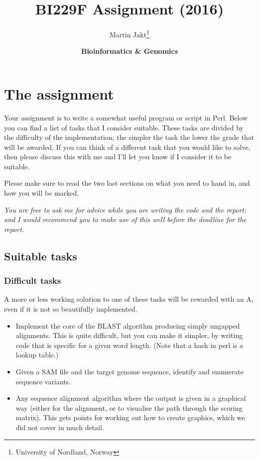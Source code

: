 \documentclass[11pt]{article}
\author{Martin Jakt\thanks{University of Nordland, Norway}}
\date{\textbf{Bioinformatics \& Genomics}}
\title{\textbf{BI229F Assignment} (2016)}
\begin{document}
\maketitle

\section{The assignment}
\label{sec-1}

Your assignment is to write a somewhat useful program or script in Perl. Below
you can find a list of tasks that I consider suitable. These tasks are divided
by the difficulty of the implementation; the simpler the task the lower the
grade that will be awarded. If you can think of a different task that you
would like to solve, then please discuss this with me and I'll let you know if
I consider it to be suitable.

Plesse make sure to read the two last sections on what you need to hand in,
and how you will be marked.

\emph{You are free to ask me for advice while you are writing the code and the
  report; and I would recommend you to make use of this well before the
  deadline for the report.}

\subsection{Suitable tasks}
\subsubsection{Difficult tasks}
A more or less working solution to one of these tasks will be rewarded with an
A, even if it is not so beautifully implemented.
\begin{itemize}
\item Implement the core of the BLAST algorithm producing simply ungapped
  alignments. This is quite difficult, but you can make it simpler, by writing
  code that is specific for a given word length. (Note that a hash in perl is
  a lookup table.)
\item Given a SAM file and the target genome sequence, identify and enumerate
  sequence variants.
\item Any sequence alignment algorithm where the output is given in a
  graphical way (either for the alignment, or to visualise the path through
  the scoring matrix). This gets points for working out how to create graphics,
  which we did not cover in much detail.
\end{itemize}
\end{document}
